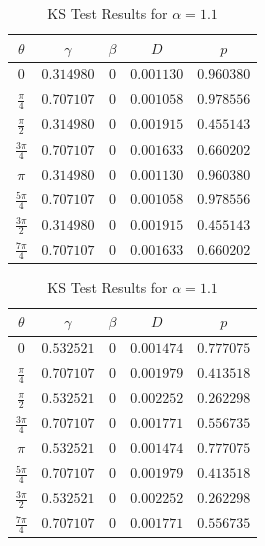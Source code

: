 \begin{table}[h]
    \centering
    \begin{minipage}{0.48\textwidth}
        \centering
        \caption{KS Test Results for $\alpha=0.6$}
        \label{tab:discrete_4mass0.6}
        \begin{tabular}{ccccc}
            \toprule
            $\theta$ & $\gamma$ & $\beta$ & $D$ & $p$ \\
            \midrule
            $0$ & $0.314980$ & $0$ & $0.001130$ & $0.960380$ \\
            $\frac{\pi}{4}$ & $0.707107$ & $0$ & $0.001058$ & $0.978556$ \\
            $\frac{\pi}{2}$ & $0.314980$ & $0$ & $0.001915$ & $0.455143$ \\
            $\frac{3\pi}{4}$ & $0.707107$ & $0$ & $0.001633$ & $0.660202$ \\
            $\pi$ & $0.314980$ & $0$ & $0.001130$ & $0.960380$ \\
            $\frac{5\pi}{4}$ & $0.707107$ & $0$ & $0.001058$ & $0.978556$ \\
            $\frac{3\pi}{2}$ & $0.314980$ & $0$ & $0.001915$ & $0.455143$ \\
            $\frac{7\pi}{4}$ & $0.707107$ & $0$ & $0.001633$ & $0.660202$ \\
            \bottomrule
        \end{tabular}
    \end{minipage}
    \hfill
    \begin{minipage}{0.48\textwidth}
    \label{tab:discrete_4mass1.1}
        \centering
        \caption{KS Test Results for $\alpha=1.1$}
        \begin{tabular}{ccccc}
            \toprule
            $\theta$ & $\gamma$ & $\beta$ & $D$ & $p$ \\
            \midrule
            $0$ & $0.532521$ & $0$ & $0.001474$ & $0.777075$ \\
            $\frac{\pi}{4}$ & $0.707107$ & $0$ & $0.001979$ & $0.413518$ \\
            $\frac{\pi}{2}$ & $0.532521$ & $0$ & $0.002252$ & $0.262298$ \\
            $\frac{3\pi}{4}$ & $0.707107$ & $0$ & $0.001771$ & $0.556735$ \\
            $\pi$ & $0.532521$ & $0$ & $0.001474$ & $0.777075$ \\
            $\frac{5\pi}{4}$ & $0.707107$ & $0$ & $0.001979$ & $0.413518$ \\
            $\frac{3\pi}{2}$ & $0.532521$ & $0$ & $0.002252$ & $0.262298$ \\
            $\frac{7\pi}{4}$ & $0.707107$ & $0$ & $0.001771$ & $0.556735$ \\
            \bottomrule
        \end{tabular}
    \end{minipage}
\end{table}

